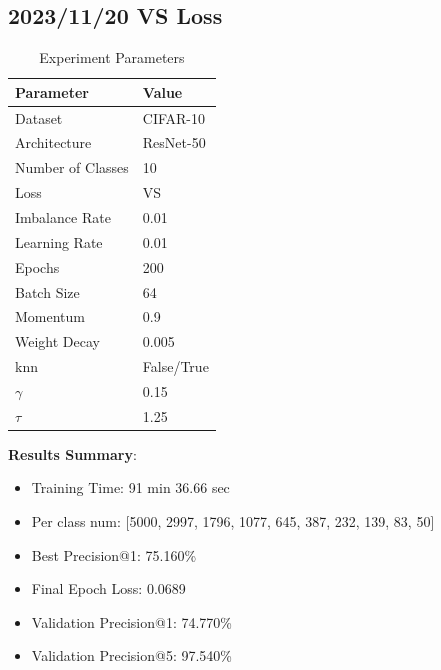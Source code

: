 \documentclass{article}
\begin{document}
\begin{multicols}{2} %
\section{2023/11/20 VS Loss}
\begin{table}[H]
\centering
\caption{Experiment Parameters}
\label{tab:parameters_vs}
\begin{tabular}{ll}
\toprule
Parameter & Value \\
\midrule
Dataset & CIFAR-10 \\
Architecture & ResNet-50 \\
Number of Classes & 10 \\
Loss & VS \\
Imbalance Rate & 0.01 \\
Learning Rate & 0.01 \\
Epochs & 200 \\
Batch Size & 64 \\
Momentum & 0.9 \\
Weight Decay & 0.005 \\
knn & False/True \\
\(\gamma\) & 0.15 \\
\(\tau\) & 1.25 \\
\bottomrule
\end{tabular}
\end{table}

\textbf{Results Summary}:
\begin{itemize}
    \item Training Time: 91 min 36.66 sec
    \item Per class num: [5000, 2997, 1796, 1077, 645, 387, 232, 139, 83, 50]
    \item Best Precision@1: 75.160\%
    \item Final Epoch Loss: 0.0689
    \item Validation Precision@1: 74.770\%
    \item Validation Precision@5: 97.540\%
\end{itemize}


\end{multicols}
\end{document}
